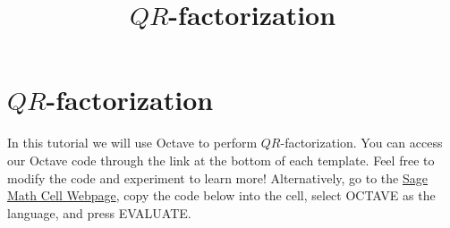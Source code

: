 \documentclass{ximera}
\title{$QR$-factorization} \license{CC BY-NC-SA 4.0}
\begin{document}
\begin{abstract}
\end{abstract}
\maketitle
\section*{$QR$-factorization}

In this tutorial we will use Octave to perform $QR$-factorization. You can access our Octave code through the link at the bottom of each template.  Feel free to modify the code and experiment to learn more!  Alternatively, go to the \href{https://sagecell.sagemath.org/}{Sage Math Cell Webpage}, copy the code below into the cell, select OCTAVE as the language, and press EVALUATE.  
\end{document}

